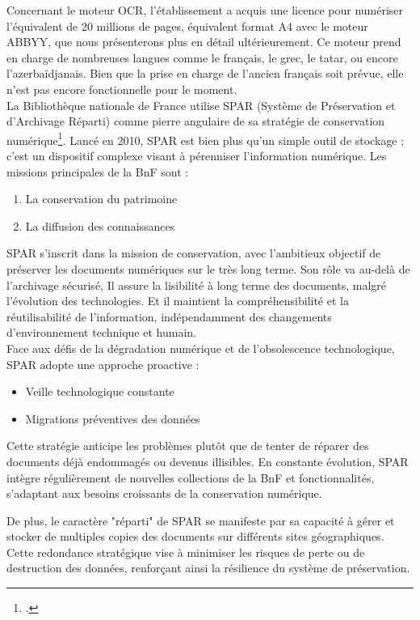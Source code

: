 \documentclass[a4paper,12pt,twoside]{book}
\begin{document}
	Concernant le moteur OCR, l’établissement a acquis une licence pour numériser l’équivalent de 20 millions de pages, équivalent format A4 avec le moteur ABBYY, que nous présenterons plus en détail ultérieurement. Ce moteur prend en charge de nombreuses langues comme le français, le grec, le tatar, ou encore l’azerbaïdjanais. Bien que la prise en charge de l’ancien français soit prévue, elle n'est pas encore fonctionnelle pour le moment.  
	\\
	
	La Bibliothèque nationale de France utilise SPAR (Système de Préservation et d'Archivage Réparti) comme pierre angulaire de sa stratégie de conservation numérique\footcite{bermes_approche_2010}. Lancé en 2010, SPAR est bien plus qu'un simple outil de stockage ; c'est un dispositif complexe visant à pérenniser l'information numérique. Les missions principales de la BnF sont :
	\begin{enumerate}
		\item La conservation du patrimoine
		\item La diffusion des connaissances
	\end{enumerate}
	
	SPAR s'inscrit dans la mission de conservation, avec l'ambitieux objectif de préserver les documents numériques sur le très long terme. Son rôle va au-delà de l'archivage sécurisé, Il assure la lisibilité à long terme des documents, malgré l'évolution des technologies. Et il maintient la compréhensibilité et la réutilisabilité de l'information, indépendamment des changements d'environnement technique et humain.
	\\
	
	Face aux défis de la dégradation numérique et de l'obsolescence technologique, SPAR adopte une approche proactive :
	\begin{itemize}
		\item Veille technologique constante
		\item Migrations préventives des données
	\end{itemize}
	
	Cette stratégie anticipe les problèmes plutôt que de tenter de réparer des documents déjà endommagés ou devenus illisibles. En constante évolution, SPAR intègre régulièrement de nouvelles collections de la BnF et fonctionnalités, s'adaptant aux besoins croissants de la conservation numérique. 
	
	De plus, le caractère "réparti" de SPAR se manifeste par sa capacité à gérer et stocker de multiples copies des documents sur différents sites géographiques. Cette redondance stratégique vise à minimiser les risques de perte ou de destruction des données, renforçant ainsi la résilience du système de préservation.
	\\
	
\end{document}
